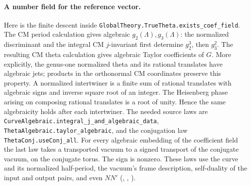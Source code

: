\paragraph{A number field for the reference vector.}\label{r14:vec-fixed}
Here is the finite descent inside
\nolinkurl{GlobalTheory.TrueTheta.exists_coef_field}. The CM period
calculation gives algebraic \(g_2(\Lambda),g_3(\Lambda)\): the normalized
discriminant and the integral CM \(j\)-invariant first determine
\(g_2^3\), then \(g_3^2\). The resulting CM theta calculation gives
algebraic Taylor coefficients of \(G\). More explicitly, the
genus-one normalized theta and its rational translates have algebraic
jets; products in the orthonormal CM coordinates preserve this property.
A normalized intertwiner is a finite sum of rational translates with
algebraic signs and inverse square root of an integer. The Heisenberg
phase arising on composing rational translates is a root of unity.
Hence the same algebraicity holds after each intertwiner. The needed
source laws are \nolinkurl{CurveAlgebraic.integral_j_and_algebraic_data},
\nolinkurl{ThetaAlgebraic.taylor_algebraic}, and the conjugation law
\nolinkurl{ThetaConj.useConj_all}. For every algebraic embedding of
the coefficient field the last law takes a transported vacuum to a
signed transport of the conjugate vacuum, on the conjugate torus.
The sign is nonzero. These laws use the curve and its normalized
half-period, the vacuum's frame description, self-duality of the
input and output pairs, and even \(NN'\)
(,
,
).


